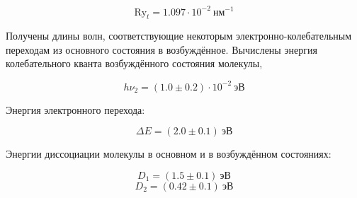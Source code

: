\documentclass[a5paper, 10pt, twoside]{article} %
\begin{document}
\[ \text{Ry}_t=1.097\cdot 10^{-2} \ \text{нм}^{-1} \]


Получены длины волн, соответствующие некоторым электронно-колебательным
переходам из основного состояния в возбуждённое. Вычислены энергия
колебательного кванта возбуждённого состояния молекулы,

\[	h\nu_2=(1.0\pm 0.2)\cdot 10^{-2} \ \text{эВ} \]

Энергия электронного перехода:

\[ \Delta E=(2.0\pm 0.1) \ \text{эВ} \]

Энергии диссоциации молекулы в основном и в возбуждённом состояниях:

\[ D_1=(1.5\pm 0.1)\  \text{эВ} \]
\[ D_2=(0.42\pm 0.1) \ \text{эВ} \]
\end{document}
